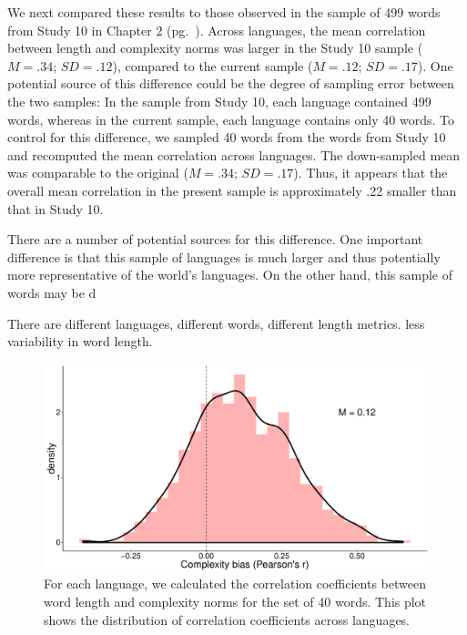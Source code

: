 We next compared these results to those observed in the sample of 499 words from Study 10 in Chapter 2 (pg.\ \pageref{ch2-10}). Across languages, the mean correlation between length and complexity norms was larger in the Study 10 sample ($M = .34$; $SD = .12$), compared to the current sample ($M = .12$; $SD = .17$). One potential source of this difference could be the degree of sampling error between the two samples: In the sample from Study 10, each language contained 499 words, whereas in the current sample, each language contains only 40 words. To control for this difference, we sampled 40 words from the words from Study 10 and recomputed  the mean correlation across languages. The down-sampled mean was comparable to the original  ($M = .34$; $SD = .17$). Thus, it appears that the overall mean correlation in the present sample is approximately .22  smaller than that in Study 10.

There are a number of potential sources for this difference. One important difference is that this sample of languages is much larger and thus potentially more representative of the world's languages. On the other hand, this sample of words may be d

There are different languages, different words, different length metrics. less variability in word length. 

\begin{figure}[t!]
\begin{center}
\includegraphics[scale = .35]{figs/chap4_1b.pdf}
\end{center}
\caption{For each language, we calculated the correlation coefficients between word length and complexity norms for the set of 40 words. This plot shows the distribution of correlation coefficients across languages. }
\label{fig:study1b}
\end{figure}

